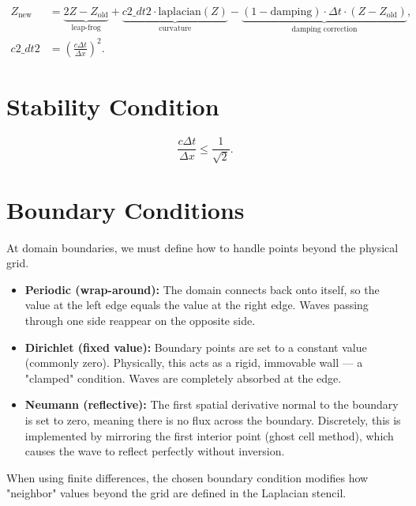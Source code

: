 \documentclass{article}
\begin{document}
\begin{equation}
\begin{aligned}
Z_{\text{new}}
&= \underbrace{2 Z - Z_{\text{old}}}_{\text{leap-frog}}
+ \underbrace{c2\_dt2 \cdot \text{laplacian}(Z)}_{\text{curvature}}
- \underbrace{(1 - \text{damping}) \cdot \Delta t \cdot (Z - Z_{\text{old}})}_{\text{damping correction}}, \\
c2\_dt2 &= \left(\frac{c \Delta t}{\Delta x}\right)^2.
\end{aligned}
\end{equation}

\section*{Stability Condition}

\begin{equation}
\frac{c \Delta t}{\Delta x} \le \frac{1}{\sqrt{2}}.
\end{equation}

\section*{Boundary Conditions}

At domain boundaries, we must define how to handle points beyond the physical grid.

\begin{itemize}
    \item \textbf{Periodic (wrap-around):} The domain connects back onto itself, so the value at the left edge equals the value at the right edge. Waves passing through one side reappear on the opposite side.
    
    \item \textbf{Dirichlet (fixed value):} Boundary points are set to a constant value (commonly zero). Physically, this acts as a rigid, immovable wall — a "clamped" condition. Waves are completely absorbed at the edge.

    \item \textbf{Neumann (reflective):} The first spatial derivative normal to the boundary is set to zero, meaning there is no flux across the boundary. Discretely, this is implemented by mirroring the first interior point (ghost cell method), which causes the wave to reflect perfectly without inversion.
\end{itemize}

When using finite differences, the chosen boundary condition modifies how "neighbor" values beyond the grid are defined in the Laplacian stencil.
\end{document}
